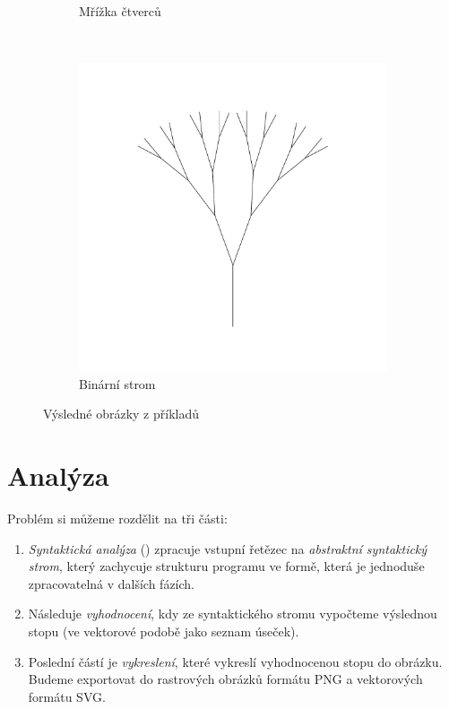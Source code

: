 \begin{figure}[H]
\begin{subfigure}{0.3\textwidth}
    \caption{Mřížka čtverců}\label{fig:krunimir-squares}
  \end{subfigure}
  ~
  \begin{subfigure}{0.3\textwidth}
    \centering
    \includegraphics[width=\textwidth]{krunimir/examples/bintree}
    \caption{Binární strom}\label{fig:krunimir-bintree}
  \end{subfigure}

  \caption{Výsledné obrázky z příkladů}
  \label{fig:krunimir-examples}
\end{figure}

\section{Analýza}

Problém si můžeme rozdělit na tři části:

\begin{enumerate}

\item \emph{Syntaktická analýza} () zpracuje vstupní řetězec na
  \emph{abstraktní syntaktický strom}, který zachycuje strukturu programu ve
  formě, která je jednoduše zpracovatelná v dalších fázích.

\item Následuje \emph{vyhodnocení}, kdy ze syntaktického stromu vypočteme
  výslednou stopu (ve vektorové podobě jako seznam úseček).

\item Poslední částí je \emph{vykreslení}, které vykreslí vyhodnocenou stopu do
  obrázku. Budeme exportovat do rastrových obrázků formátu PNG a vektorových
  formátu SVG.

\end{enumerate}

